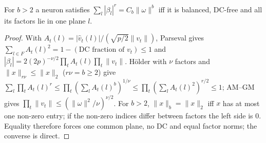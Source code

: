 \documentclass[11pt]{article}
\theoremstyle{remark}\newtheorem{remark}[theorem]{Remark}
\begin{document}
\begin{lemma}\label{l:budget}
For $b>2$ a neuron satisfies $\sum_l|\beta_l|^r=C_b\|\omega\|^b$ iff it is balanced, DC-free and all its factors lie in one plane $l$.
\end{lemma}
\begin{proof}
With $A_t(l)=|\hat v_t(l)|/(\sqrt{p/2}\|v_t\|)$, Parseval gives $\sum_{l\in F}A_t(l)^2=1-(\text{DC fraction of }v_t)\le1$ and
$|\beta_l|=2(2p)^{-\nu/2}\prod_tA_t(l)\prod_t\|v_t\|$. Hölder with $\nu$ factors and $\|x\|_{r\nu}\le\|x\|_2$ ($r\nu=b\ge2$) give
$\sum_l\prod_tA_t(l)^r\le\prod_t(\sum_lA_t(l)^{b})^{1/\nu}\le\prod_t(\sum_lA_t(l)^2)^{r/2}\le1$; AM--GM gives $\prod_t\|v_t\|\le(\|\omega\|^2/\nu)^{\nu/2}$.
For $b>2$, $\|x\|_b=\|x\|_2$ iff $x$ has at most one non-zero entry; if the non-zero indices differ between factors the left side is $0$.
Equality therefore forces one common plane, no DC and equal factor norms; the converse is direct.
\end{proof}
\end{document}
